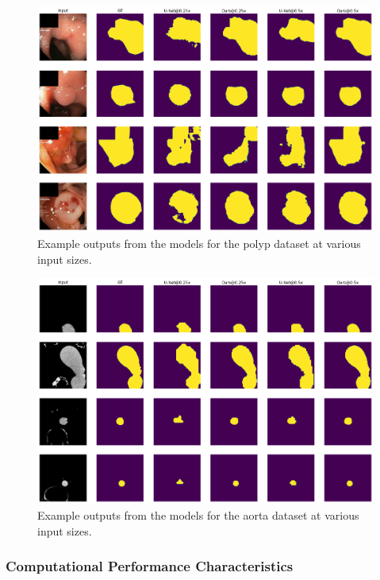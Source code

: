 \begin{figure}[t!]
	\includegraphics[width=\textwidth]{images/5/output_examples_polyp.png}
	\caption{Example outputs from the models for the polyp dataset at various input sizes. \cite{bencevicSegmentthenSegmentContextPreservingCropBased2023a}\label{fig:examples-polyp}}
\end{figure}

\begin{figure}[t!]
	\includegraphics[width=\textwidth]{images/5/output_examples_aa.png}
	\caption{Example outputs from the models for the aorta dataset at various input sizes. \cite{bencevicSegmentthenSegmentContextPreservingCropBased2023a}\label{fig:examples-aa}}
\end{figure}

\FloatBarrier

\subsubsection{Computational Performance Characteristics}

